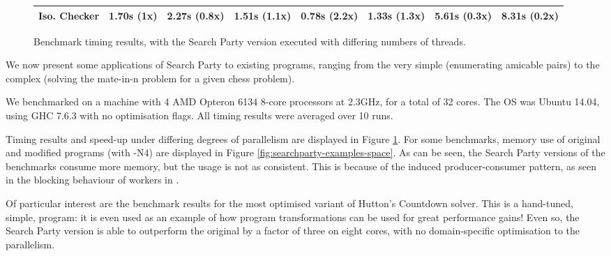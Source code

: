 \begin{figure}[ht]
\begin{tabularx}{\textwidth}{|r|X|X|X|X|X|X|X|}
           Iso. Checker   & 1.70s (1x)
                          & 2.27s (0.8x)
                          & 1.51s (1.1x)
                          & 0.78s (2.2x)
                          & 1.33s (1.3x)
                          & 5.61s (0.3x)
                          & 8.31s (0.2x)\\
    \hline
  \end{tabularx}  
  \caption{Benchmark timing results, with the Search Party version
    executed with differing numbers of threads.}
  \label{fig:searchparty-examples-time}
\end{figure}

We now present some applications of Search Party to existing programs,
ranging from the very simple (enumerating amicable pairs) to the
complex (solving the mate-in-n problem for a given chess problem).

We benchmarked on a machine with 4 AMD Opteron 6134 8-core processors
at 2.3GHz, for a total of 32 cores. The OS was Ubuntu 14.04, using GHC
7.6.3 with no optimisation flags. All timing results were averaged
over 10 runs.

Timing results and speed-up under differing degrees of parallelism are
displayed in Figure \ref{fig:searchparty-examples-time}. For some
benchmarks, memory use of original and modified programs (with -N4)
are displayed in Figure \ref{fig:searchparty-examples-space}. As can
be seen, the Search Party versions of the benchmarks consume more
memory, but the usage is not as consistent. This is because of the
induced producer-consumer pattern, as seen in the blocking behaviour
of workers in .

Of particular interest are the benchmark results for the most
optimised variant of Hutton's Countdown solver. This is a hand-tuned,
simple, program: it is even used as an example of how program
transformations can be used for great performance gains! Even so, the
Search Party version is able to outperform the original by a factor of
three on eight cores, with no domain-specific optimisation to the
parallelism.

